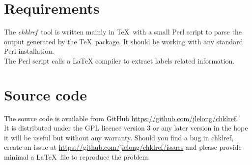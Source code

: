\documentclass[a4paper,11pt,twoside]{article}
\def\chk{{\it chklref}}
\begin{document}
\section{Requirements}

The \chk\ tool is written mainly in \TeX\ with a small Perl script to parse the output generated by the \TeX\ package. It should be working with any standard Perl installation. \\

The Perl script calls a LaTeX compiler to extract labels related information.

\section{Source code}

The source code is available from GitHub \url{https://github.com/jlelong/chklref}. \\

It is distributed under the GPL licence version 3 or any later version in the hope it will be useful but without any warranty. Should you find a bug in chklref, create an issue at \url{https://github.com/jlelong/chklref/issues} and please provide minimal a \LaTeX\ file to reproduce the problem.
\end{document}

